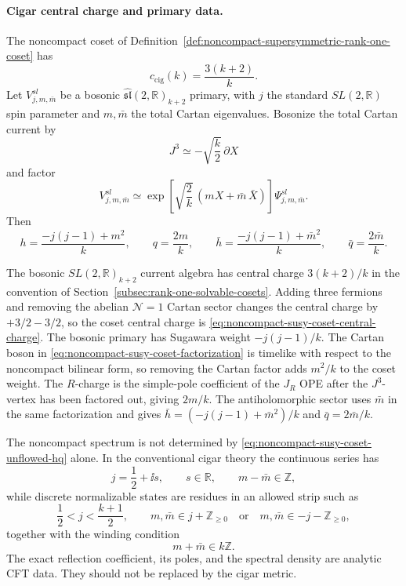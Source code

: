 \paragraph{Cigar central charge and primary data.}
The noncompact coset of
Definition~\ref{def:noncompact-supersymmetric-rank-one-coset} has
\begin{equation}
  c_{\mathrm{cig}}(k)=\frac{3(k+2)}{k}.
  \label{eq:noncompact-susy-coset-central-charge}
\end{equation}
Let \(V^{sl}_{j,m,\bar m}\) be a bosonic
\(\widehat{\mathfrak{sl}}(2,\mathbb R)_{k+2}\) primary, with \(j\) the
standard \(SL(2,\mathbb R)\) spin parameter and \(m,\bar m\) the total
Cartan eigenvalues.  Bosonize the total Cartan current by
\[
  J^3\simeq-\sqrt{\frac k2}\,\partial X
\]
and factor
\begin{equation}
  V^{sl}_{j,m,\bar m}
  \simeq
  \exp\left[
    \sqrt{\frac2k}\,(mX+\bar m\,\bar X)
  \right]
  \Psi^{sl}_{j,m,\bar m}.
  \label{eq:noncompact-susy-coset-factorization}
\end{equation}
Then
\begin{equation}
  h=\frac{-j(j-1)+m^2}{k},
  \qquad
  q=\frac{2m}{k},
  \qquad
  \bar h=\frac{-j(j-1)+\bar m^2}{k},
  \qquad
  \bar q=\frac{2\bar m}{k}.
  \label{eq:noncompact-susy-coset-unflowed-hq}
\end{equation}

The bosonic \(SL(2,\mathbb R)_{k+2}\) current algebra has central charge
\(3(k+2)/k\) in the convention of
Section~\ref{subsec:rank-one-solvable-cosets}.  Adding three fermions and
removing the abelian \(\mathcal N=1\) Cartan sector changes the central
charge by \(+3/2-3/2\), so the coset central charge is
\eqref{eq:noncompact-susy-coset-central-charge}.  The bosonic primary has
Sugawara weight \(-j(j-1)/k\).  The Cartan boson in
\eqref{eq:noncompact-susy-coset-factorization} is timelike with respect to
the noncompact bilinear form, so removing the Cartan factor adds \(m^2/k\)
to the coset weight.  The \(R\)-charge is the simple-pole coefficient of
the \(J_R\) OPE after the \(J^3\)-vertex has been factored out, giving
\(2m/k\).  The antiholomorphic sector uses \(\bar m\) in the same
factorization and gives
\(\bar h=(-j(j-1)+\bar m^2)/k\) and \(\bar q=2\bar m/k\).

The noncompact spectrum is not determined by
\eqref{eq:noncompact-susy-coset-unflowed-hq} alone.  In the conventional
cigar theory the continuous series has
\[
  j=\frac12+\ii s,
  \qquad
  s\in\mathbb R,
  \qquad
  m-\bar m\in\mathbb Z,
\]
while discrete normalizable states are residues in an allowed strip such as
\[
  \frac12<j<\frac{k+1}{2},
  \qquad
  m,\bar m\in j+\mathbb Z_{\ge0}
  \quad\text{or}\quad
  m,\bar m\in -j-\mathbb Z_{\ge0},
\]
together with the winding condition
\begin{equation}
  m+\bar m\in k\mathbb Z .
  \label{eq:noncompact-susy-coset-unflowed-winding}
\end{equation}
The exact reflection coefficient, its poles, and the spectral density are
analytic CFT data.  They should not be replaced by the cigar metric.


